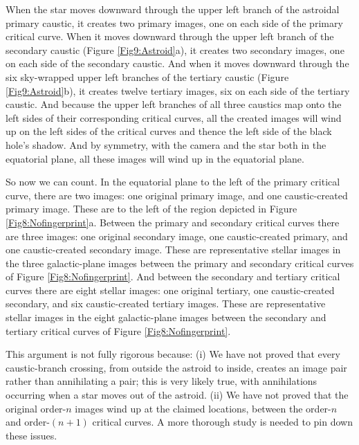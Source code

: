 \documentclass[12pt]{iopart}
\begin{document}
When the star moves downward through the upper left branch of the 
astroidal primary caustic, it creates two
primary images, one on each side of the primary critical curve.  When it
moves downward through the upper left branch of the secondary caustic (Figure
\ref{Fig9:Astroid}a),
it creates two secondary images, one on each side of the secondary
caustic.  And when it moves downward through the six sky-wrapped upper
left branches of the tertiary caustic (Figure \ref{Fig9:Astroid}b), it creates twelve tertiary images, 
six on each side of the tertiary caustic.  And because the upper left
branches of all three caustics map onto the left sides of their
corresponding critical curves, all the created images will wind up on
the left sides of the critical curves and thence the left side of the
black hole's shadow.  And by symmetry, with the camera and the star both
in the equatorial plane, all these images will wind up in the equatorial
plane.

So now we can count. In the equatorial plane to the left of the primary critical curve, there are
two images: one original primary image, and one caustic-created primary image.
These are to the left of the region depicted in  Figure \ref{Fig8:Nofingerprint}a.  Between the primary and
secondary critical curves there are three images: one original secondary image, 
one caustic-created primary, and one caustic-created secondary image.  These
are representative stellar images in the three galactic-plane images
between the primary and secondary critical curves  of Figure \ref{Fig8:Nofingerprint}.  And
between the secondary and tertiary critical curves there are eight stellar
images: one original tertiary, one caustic-created secondary, and six 
caustic-created tertiary images.  These are representative stellar images in
the eight galactic-plane images between the secondary and tertiary
critical curves of Figure \ref{Fig8:Nofingerprint}. 

This argument is not fully rigorous because: (i) We have not proved that
every caustic-branch crossing, from outside the astroid to inside,
creates an image pair rather than annihilating a pair; this is very
likely true, with annihilations occurring when a star moves out of the
astroid.  (ii) We have not proved that the original order-$n$ images wind
up at the claimed locations, between the order-$n$ and order-$(n+1)$
critical curves.  A more thorough study is needed to pin down these
issues.  
 
\end{document}
